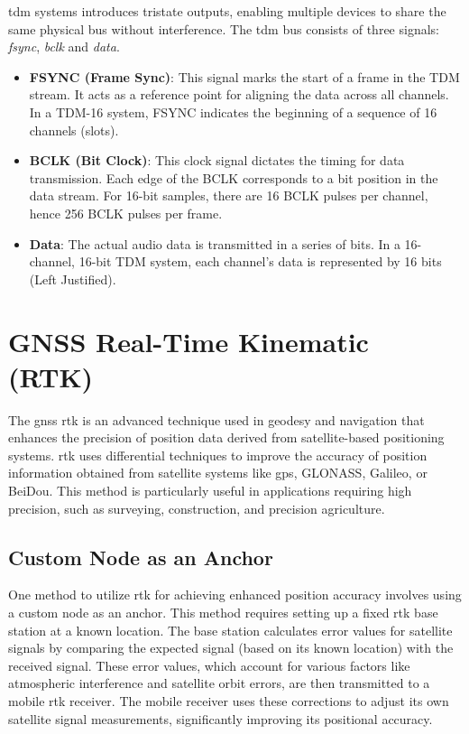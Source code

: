 \acrfull{tdm} systems introduces tristate outputs, enabling multiple devices to share the same physical bus without interference.
The \acrshort{tdm} bus consists of three signals: \textit{fsync}, \textit{bclk} and \textit{data}.
\begin{itemize}
	\item \textbf{FSYNC (Frame Sync)}: This signal marks the start of a frame in the TDM stream.
	      It acts as a reference point for aligning the data across all channels.
	      In a TDM-16 system, FSYNC indicates the beginning of a sequence of 16 channels (slots).
	\item \textbf{BCLK (Bit Clock)}: This clock signal dictates the timing for data transmission.
	      Each edge of the BCLK corresponds to a bit position in the data stream.
	      For 16-bit samples, there are 16 BCLK pulses per channel, hence 256 BCLK pulses per frame.
	\item \textbf{Data}: The actual audio data is transmitted in a series of bits.
	      In a 16-channel, 16-bit TDM system, each channel's data is represented by 16 bits (Left Justified).
\end{itemize}


\section{GNSS Real-Time Kinematic (RTK)}
The \acrfull{gnss} \acrfull{rtk} is an advanced technique used in geodesy and navigation
that enhances the precision of position data derived from satellite-based positioning systems.
\acrshort{rtk} uses differential techniques to improve the accuracy of position information obtained from satellite systems like
\acrshort{gps}, GLONASS, Galileo, or BeiDou.
This method is particularly useful in applications requiring high precision,
such as surveying, construction, and precision agriculture.

\subsection{Custom Node as an Anchor}
One method to utilize \acrshort{rtk} for achieving enhanced position accuracy involves using a custom node as an anchor.
This method requires setting up a fixed \acrshort{rtk} base station at a known location.
The base station calculates error values for satellite signals by comparing the expected signal (based on its known location) with the received signal.
These error values, which account for various factors like atmospheric interference and satellite orbit errors,
are then transmitted to a mobile \acrshort{rtk} receiver.
The mobile receiver uses these corrections to adjust its own satellite signal measurements, significantly improving its positional accuracy.

